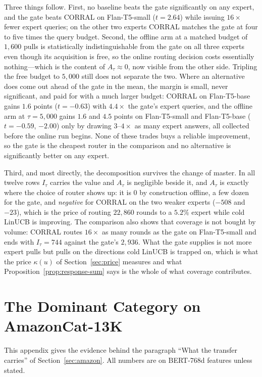 \documentclass[anon]{alt2027} %
\begin{document}
Three things follow. First, no baseline beats the gate significantly on any
expert, and the gate beats CORRAL on Flan-T5-small ($t=2.64$) while issuing
$16\times$ fewer expert queries; on the other two experts CORRAL matches the
gate at four to five times the query budget. Second, the offline arm at a
matched budget of $1{,}600$ pulls is statistically indistinguishable from the
gate on all three experts even though its acquisition is free, so the online
routing decision costs essentially nothing---which is the content of
$A_\tau\approx0$, now visible from the other side. Tripling the free budget to
$5{,}000$ still does not separate the two. Where an alternative does come out
ahead of the gate in the mean, the margin is small, never significant, and
paid for with a much larger budget: CORRAL on Flan-T5-base gains $1.6$
points ($t=-0.63$) with $4.4\times$ the gate's expert queries, and the
offline arm at $\tau=5{,}000$ gains $1.6$ and $4.5$ points on Flan-T5-small
and Flan-T5-base ($t=-0.59$, $-2.00$) only by drawing $3$--$4\times$ as many
expert answers, all collected before the online run begins. None of these
trades buys a reliable improvement, so the gate is the cheapest router in
the comparison and no alternative is significantly better on any expert.

Third, and most directly, the decomposition survives the change of master. In
all twelve rows $I_\tau$ carries the value and $A_\tau$ is negligible beside
it, and $A_\tau$ is exactly where the choice of router shows up: it is $0$ by
construction offline, a few dozen for the gate, and \emph{negative} for CORRAL
on the two weaker experts ($-508$ and $-23$), which is the price of routing
$22{,}860$ rounds to a $5.2\%$ expert while cold LinUCB is improving. The
comparison also shows that coverage is not bought by volume: CORRAL routes
$16\times$ as many rounds as the gate on Flan-T5-small and ends with
$I_\tau=744$ against the gate's $2{,}936$. What the gate supplies is not more
expert pulls but pulls on the directions cold LinUCB is trapped on, which is
what the price $\kappa(u)$ of Section~\ref{sec:price} measures and what
Proposition~\ref{prop:response-sum} says is the whole of what coverage contributes.

\section{The Dominant Category on AmazonCat-13K}
\label{app:dominant}

This appendix gives the evidence behind the paragraph ``What the transfer
carries'' of Section~\ref{sec:amazon}. All numbers are on BERT-768d features
unless stated.
\end{document}
